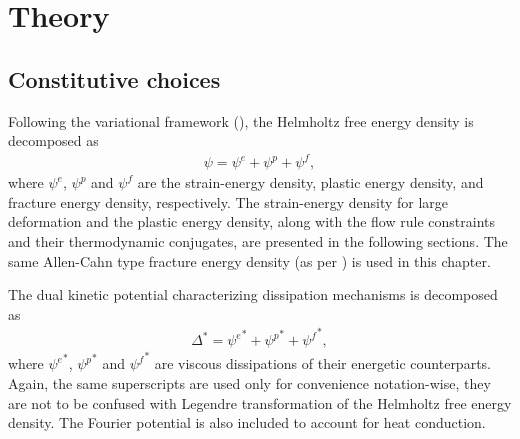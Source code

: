 \section{Theory}
\label{section: Chapter5/theory}

\subsection{Constitutive choices}

Following the variational framework (), the Helmholtz free energy density is decomposed as
\begin{align}
  \psi = \psi^e + \psi^p + \psi^f, \label{eq: chapter 5 helmholtz}
\end{align}
where $\psi^e$, $\psi^p$ and $\psi^f$ are the strain-energy density, plastic energy density, and fracture energy density, respectively. The strain-energy density for large deformation and the plastic energy density, along with the flow rule constraints and their thermodynamic conjugates, are presented in the following sections. The same Allen-Cahn type fracture energy density (as per ) is used in this chapter.

The dual kinetic potential characterizing dissipation mechanisms is decomposed as
\begin{align}
  \Delta^* = {\psi^e}^* + {\psi^p}^* + {\psi^f}^*, \label{eq: chapter 5 dual kinetic potential}
\end{align}
where ${\psi^e}^*$, ${\psi^p}^*$ and ${\psi^f}^*$ are viscous dissipations of their energetic counterparts. Again, the same superscripts are used only for convenience notation-wise, they are not to be confused with Legendre transformation of the Helmholtz free energy density. The Fourier potential is also included to account for heat conduction.


